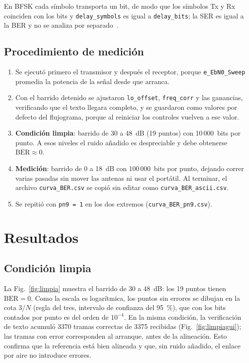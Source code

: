 \documentclass[conference]{IEEEtran}
\begin{document}
En BFSK cada símbolo transporta un bit, de modo que los símbolos Tx y Rx coinciden con los bits y \texttt{delay\_symbols} es igual a \texttt{delay\_bits}; la SER es igual a la BER y no se analiza por separado~\cite{guia4a}.

\subsection{Procedimiento de medición}

\begin{enumerate}
\item Se ejecutó primero el transmisor y después el receptor, porque \texttt{e\_EbN0\_Sweep} promedia la potencia de la señal desde que arranca.
\item Con el barrido detenido se ajustaron \texttt{lo\_offset}, \texttt{freq\_corr} y las ganancias, verificando que el texto llegara completo, y se guardaron como valores por defecto del flujograma, porque al reiniciar los controles vuelven a ese valor.
\item \textbf{Condición limpia}: barrido de 30 a 48~dB (19 puntos) con 10\,000~bits por punto. A esos niveles el ruido añadido es despreciable y debe obtenerse $\text{BER} \approx 0$.
\item \textbf{Medición}: barrido de 0 a 18~dB con 100\,000~bits por punto, dejando correr varias pasadas sin mover las antenas ni usar el portátil. Al terminar, el archivo \texttt{curva\_BER.csv} se copió sin editar como \texttt{curva\_BER\_ascii.csv}.
\item Se repitió con \texttt{pn9 = 1} en los dos extremos (\texttt{curva\_BER\_pn9.csv}).
\end{enumerate}

\section{Resultados}

\subsection{Condición limpia}

La Fig.~\ref{fig:limpia} muestra el barrido de 30 a 48~dB: los 19 puntos tienen $\text{BER} = 0$. Como la escala es logarítmica, los puntos sin errores se dibujan en la cota $3/N$ (regla del tres, intervalo de confianza del 95~\%), que con los bits contados por punto es del orden de $10^{-4}$. En la misma condición, la verificación de texto acumuló 3370 tramas correctas de 3375 recibidas (Fig.~\ref{fig:limpiagui}); las tramas con error corresponden al arranque, antes de la alineación. Esto confirma que la referencia está bien alineada y que, sin ruido añadido, el enlace por aire no introduce errores.
\end{document}
